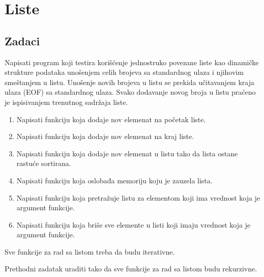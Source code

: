 
\chapter{Liste}

\section{Zadaci}

\begin{Exercise}[label=601]
Napisati program koji testira korišćenje jednostruko povezane liste kao 
dinamičke strukture podataka unošenjem celih brojeva sa standardnog ulaza i 
njihovim smeštanjem u listu. 
Unošenje novih brojeva u listu se prekida učitavanjem kraja ulaza (EOF) sa 
standardnog ulaza. Svako dodavanje novog broja u listu praćeno je ispisivanjem 
trenutnog sadržaja liste. 
\begin{enumerate}
 \item Napisati funkciju koja dodaje nov elemenat na početak liste.
 \item Napisati funkciju koja dodaje nov elemenat na kraj liste.
 \item Napisati funkciju koja dodaje nov elemenat u listu tako da lista ostane rastuće sortirana.
 \item Napisati funkciju koja oslobađa memoriju koju je zauzela lista.
 \item Napisati funkciju koja pretražuje listu za elementom koji ima vrednost koja je argument funkcije.
 \item Napisati funkciju koja briše sve elemente u listi koji imaju vrednost koja je argument funkcije.
\end{enumerate}
Sve funkcije za rad sa listom treba da budu iterativne.
\end{Exercise}
\begin{Answer}[ref=601]
\end{Answer}


\begin{Exercise}[label=602]
Prethodni zadatak uraditi tako da sve funkcije za rad sa listom budu rekurzivne.
\end{Exercise}
\begin{Answer}[ref=602]
\end{Answer}


